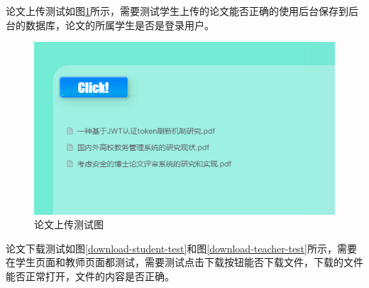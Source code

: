 论文上传测试如图\ref{upload-test}所示，需要测试学生上传的论文能否正确的使用后台保存到后台的数据库，论文的所属学生是否是登录用户。

\begin{figure}[htbp]
  \centering
  \includegraphics[scale = 0.8]{out/figure/测试/upload-test.png}
  \caption{\song\wuhao 论文上传测试图}
  \label{upload-test}
\end{figure}

论文下载测试如图\ref{download-student-test}和图\ref{download-teacher-test}所示，需要在学生页面和教师页面都测试，需要测试点击下载按钮能否下载文件，下载的文件能否正常打开，文件的内容是否正确。

